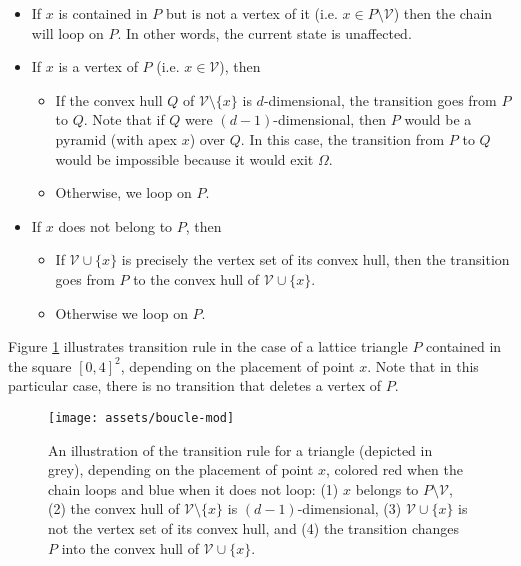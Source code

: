 \documentclass[a4paper]{article}
\begin{document}
\begin{itemize}
\item If $x$ is contained in $P$ but is not a vertex of it (i.e. $x\in{P}\mathord{\setminus}\mathcal{V}$) then the chain will loop on $P$. In other words, the current state is unaffected.
\item If $x$ is a vertex of $P$ (i.e. $x\in\mathcal{V}$), then
  \begin{itemize}
    \item If the convex hull $Q$ of $\mathcal{V}\mathord{\setminus}\{x\}$ is $d$-dimensional, the transition goes from $P$ to $Q$. Note that if $Q$ were $(d-1)$-dimensional, then $P$ would be a pyramid (with apex $x$) over $Q$. In this case, the transition from $P$ to $Q$ would be impossible because it would exit $\Omega$.
    \item Otherwise, we loop on $P$.
  \end{itemize}
  \item If $x$ does not belong to $P$, then
  \begin{itemize}
    \item If $\mathcal{V}\cup\{x\}$ is precisely the vertex set of its convex hull, then the transition goes from $P$ to the convex hull of $\mathcal{V}\cup \{x\}$.
    \item Otherwise we loop on $P$.
  \end{itemize}
\end{itemize}

Figure \ref{fig:boucle} illustrates transition rule in the case of a lattice triangle $P$ contained in the square $[0,4]^2$, depending on the placement of point $x$. Note that in this particular case, there is no transition that deletes a vertex of $P$.

\begin{figure}
  \begin{center}
    \texttt{[image: assets/boucle-mod]}
    \caption{An illustration of the transition rule for a triangle (depicted in grey), depending on the placement of point $x$, colored red when the chain loops and blue when it does not loop: (1) $x$ belongs to $P\mathord{\setminus}\mathcal{V}$, (2) the convex hull of $\mathcal{V}\mathord{\setminus}\{x\}$ is $(d-1)$-dimensional, (3) $\mathcal{V}\cup\{x\}$ is not the vertex set of its convex hull, and (4) the transition changes $P$ into the convex hull of $\mathcal{V}\cup\{x\}$.}
    \label{fig:boucle}
  \end{center}
\end{figure}
\end{document}
